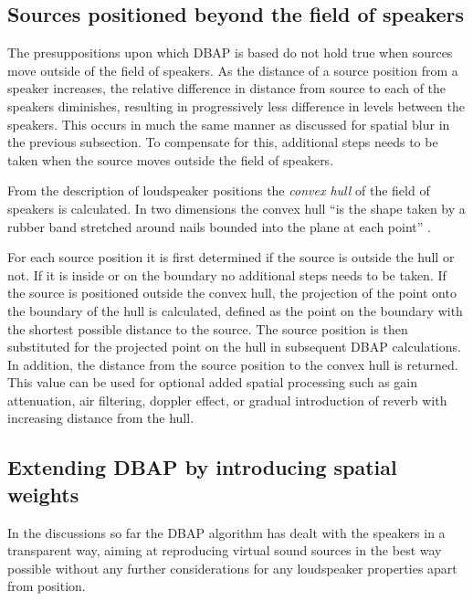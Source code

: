 \documentclass[twoside,10pt]{article}
\begin{document}
\subsection{Sources positioned beyond the field of speakers}


The presuppositions upon which DBAP is based do not hold true when sources move outside of the field of speakers. As the distance of a source position from a speaker increases, the relative difference in distance from source to each of the speakers diminishes, resulting in progressively less difference in levels between the speakers.  This occurs in much the same manner as discussed for spatial blur in the previous subsection. To compensate for this, additional steps needs to be taken when the source moves outside the field of speakers.

From the description of loudspeaker positions the \emph{convex hull} of the field of speakers is calculated. In two dimensions the convex hull ``is the shape taken by a rubber band stretched around nails bounded into the plane at each point'' \cite{Rourke:1998_geometry}.

For each source position it is first determined if the source is outside the hull or not. If it is inside or on the boundary no additional steps needs to be taken. If the source is positioned outside the convex hull, the projection of the point onto the boundary of the hull is calculated, defined as the point on the boundary with the shortest possible distance to the source. The source position is then substituted for the projected point on the hull in subsequent DBAP calculations. In addition, the distance from the source position to the convex hull is returned. This value can be used for optional added spatial processing such as gain attenuation, air filtering, doppler effect, or gradual introduction of reverb with increasing distance from the hull.




\subsection{Extending DBAP by introducing spatial weights}

In the discussions so far the DBAP algorithm has dealt with the speakers in a transparent way, aiming at reproducing virtual sound sources in the best way possible without any further considerations for any loudspeaker properties apart from position.
\end{document}
